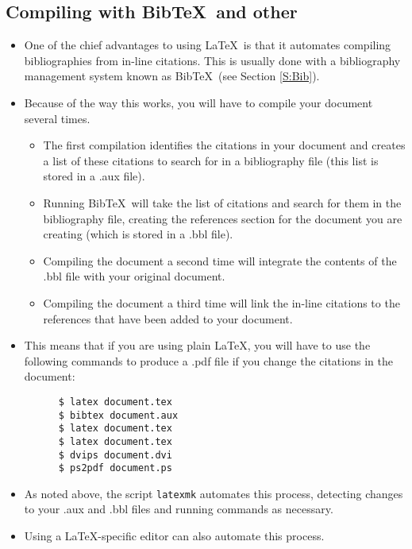\documentclass[11pt, letterpaper]{article}
\begin{document}
  \subsection{Compiling with Bib\TeX\ and other}
  
    \begin{itemize}
      \item One of the chief advantages to using \LaTeX\ is that it automates compiling bibliographies from in-line citations. This is usually done with a bibliography management system known as Bib\TeX\ (see Section \ref{S:Bib}).
      
      \item Because of the way this works, you will have to compile your document several times.
      
	  \begin{itemize}
	  
	    \item The first compilation identifies the citations in your document and creates a list of these citations to search for in a bibliography file (this list is stored in a .aux file).
	    
	    \item Running Bib\TeX\ will take the list of citations and search for them in the bibliography file, creating the references section for the document you are creating (which is stored in a .bbl file).
	    
	    \item Compiling the document a second time will integrate the contents of the .bbl file with your original document.
	    
	    \item Compiling the document a third time will link the in-line citations to the references that have been added to your document.
	  
	  \end{itemize}
	  
	\item This means that if you are using plain \LaTeX, you will have to use the following commands to produce a .pdf file if you change the citations in the document:
	
	\begin{verbatim}
	  $ latex document.tex
	  $ bibtex document.aux
	  $ latex document.tex
	  $ latex document.tex
	  $ dvips document.dvi
	  $ ps2pdf document.ps
	\end{verbatim}
	
	\item As noted above, the script \verb|latexmk| automates this process, detecting changes to your .aux and .bbl files and running commands as necessary.
	
	\item Using a \LaTeX-specific editor can also automate this process.

    \end{itemize}
\end{document}
